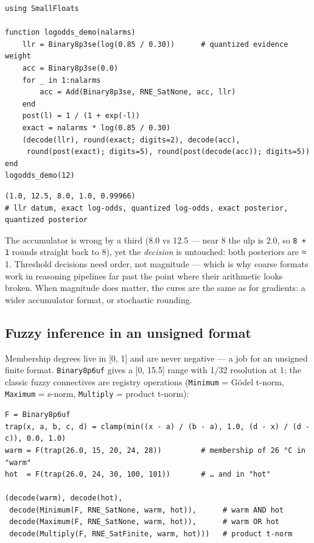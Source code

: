 \begin{verbatim}
using SmallFloats

function logodds_demo(nalarms)
    llr = Binary8p3se(log(0.85 / 0.30))      # quantized evidence weight
    acc = Binary8p3se(0.0)
    for _ in 1:nalarms
        acc = Add(Binary8p3se, RNE_SatNone, acc, llr)
    end
    post(l) = 1 / (1 + exp(-l))
    exact = nalarms * log(0.85 / 0.30)
    (decode(llr), round(exact; digits=2), decode(acc),
     round(post(exact); digits=5), round(post(decode(acc)); digits=5))
end
logodds_demo(12)
\end{verbatim}




\begin{verbatim}
(1.0, 12.5, 8.0, 1.0, 0.99966)
# llr datum, exact log-odds, quantized log-odds, exact posterior, quantized posterior
\end{verbatim}



The accumulator is wrong by a third (8.0 vs 12.5 — near 8 the ulp is 2.0, so \texttt{8 + 1} rounds straight back to 8), yet the \emph{decision} is untouched: both posteriors are ≈ 1. Threshold decisions need order, not magnitude — which is why coarse formats work in reasoning pipelines far past the point where their arithmetic looks broken. When magnitude does matter, the cures are the same as for gradients: a wider accumulator format, or stochastic rounding.



\subsection{Fuzzy inference in an unsigned format}



\label{10838530668520339695}{}


Membership degrees live in [0, 1] and are never negative — a job for an unsigned finite format. \texttt{Binary8p6uf} gives a [0, 15.5] range with 1/32 resolution at 1; the classic fuzzy connectives are registry operations (\texttt{Minimum} = Gödel t-norm, \texttt{Maximum} = s-norm, \texttt{Multiply} = product t-norm):




\begin{verbatim}
F = Binary8p6uf
trap(x, a, b, c, d) = clamp(min((x - a) / (b - a), 1.0, (d - x) / (d - c)), 0.0, 1.0)
warm = F(trap(26.0, 15, 20, 24, 28))         # membership of 26 °C in "warm"
hot  = F(trap(26.0, 24, 30, 100, 101))       # … and in "hot"

(decode(warm), decode(hot),
 decode(Minimum(F, RNE_SatNone, warm, hot)),      # warm AND hot
 decode(Maximum(F, RNE_SatNone, warm, hot)),      # warm OR hot
 decode(Multiply(F, RNE_SatFinite, warm, hot)))   # product t-norm
\end{verbatim}




